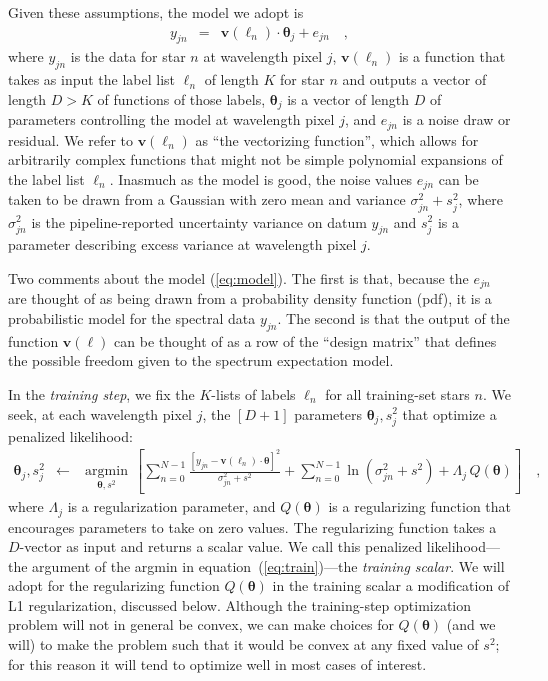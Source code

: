 \documentclass[12pt,preprint]{aastex}
\newcommand{\Dvector}[1]{\boldsymbol{#1}}
\newcommand{\vectheta}{\Dvector{\theta}}
\newcommand{\vecv}{\Dvector{v}}
\newcommand{\argmin}[1]{\underset{#1}{\operatorname{argmin}}\,}
\begin{document}
\noindent{}Given these assumptions, the model we adopt is
\begin{eqnarray}
  y_{jn} &=& \vecv(\ell_n)\cdot\vectheta_j + e_{jn}
  \label{eq:model}\quad ,
\end{eqnarray}
where $y_{jn}$ is the data for star $n$ at wavelength pixel $j$,
$\vecv(\ell_n)$ is a function that takes as input
the label list $\ell_n$ of length $K$ for star $n$
and outputs a vector of length $D>K$ of functions of those labels,
$\vectheta_j$ is a vector of length $D$ of parameters controlling the model at wavelength pixel $j$,
and $e_{jn}$ is a noise draw or residual.  We refer to $\vecv(\ell_n)$ as ``the vectorizing function'', which allows for arbitrarily complex functions that might not be simple polynomial expansions of the label list $\ell_n$.  
Inasmuch as the model is good, the noise values $e_{jn}$ can be taken to be
drawn from a Gaussian with zero mean and variance $\sigma^2_{jn}+s^2_j$,
where $\sigma^2_{jn}$ is the pipeline-reported uncertainty variance on datum
$y_{jn}$ and $s^2_j$ is a parameter describing excess variance at wavelength pixel $j$.

Two comments about the model (\ref{eq:model}).
The first is that, because the $e_{jn}$ are thought of as being drawn from a 
probability density function (pdf), it is a probabilistic model for the spectral
data $y_{jn}$.
The second is that the output of the function $\vecv(\ell)$ can be thought
of as a row of the ``design matrix'' that defines the possible freedom
given to the spectrum expectation model.

In the \emph{training step}, we fix the $K$-lists of labels $\ell_n$
for all training-set stars $n$.
We seek, at each wavelength pixel $j$, the $[D+1]$ parameters
$\vectheta_j,s^2_j$ that optimize a penalized likelihood:
\begin{eqnarray}\label{eq:train}
  \vectheta_j,s^2_j &\leftarrow& \argmin{\vectheta,s^2}\left[
    \sum_{n=0}^{N-1} \frac{[y_{jn}-\vecv(\ell_n)\cdot\vectheta]^2}{\sigma^2_{jn}+s^2}
    + \sum_{n=0}^{N-1} \ln(\sigma^2_{jn}+s^2)
    + \Lambda_j\,Q(\vectheta)
    \right]
  \quad ,
\end{eqnarray}
where $\Lambda_j$ is a regularization parameter, and $Q(\vectheta)$ is a 
regularizing function that encourages parameters to take on zero values.
The regularizing function takes a $D$-vector as input and returns a
scalar value.
We call this penalized likelihood---the argument of the
argmin in equation~(\ref{eq:train})---the \emph{training scalar}.
We will adopt for the regularizing function $Q(\vectheta)$ in the training scalar a
modification of L1 regularization, discussed below.
Although the training-step optimization problem will not in general be
convex, we can make choices for $Q(\vectheta)$ (and we will) to make the
problem such that it would be convex at any fixed value of $s^2$; for
this reason it will tend to optimize well in most cases of interest.
\end{document}
